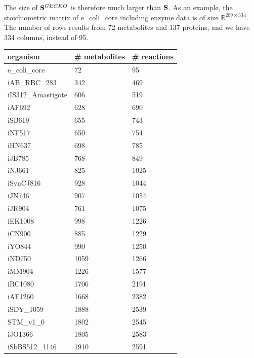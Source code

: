 The size of $\bold S^{GECKO}$ is therefore much larger than $\bold S$.
As an example, the stoichiometric matrix of \textsf{e\_coli\_core} including enzyme data is of size $\mathbb{R}^{209 \times 334}$. The number of rows results from 72 metabolites and 137 proteins, and we have 334 columns, instead of 95. 
\begin{table}[!ht]
    \centering
    \begin{tabular}{lll}
    \hline
        \textbf{organism} & \textbf{\# metabolites} & \textbf{\# reactions} \\ \hline
        e\_coli\_core & 72 & 95 \\ 
        iAB\_RBC\_283 & 342 & 469 \\ 
        iIS312\_Amastigote & 606 & 519 \\ 
        iAF692 & 628 & 690 \\ 
        iSB619 & 655 & 743 \\ 
        iNF517 & 650 & 754 \\ 
        iHN637 & 698 & 785 \\ 
        iJB785 & 768 & 849 \\ 
        iNJ661 & 825 & 1025 \\ 
        iSynCJ816 & 928 & 1044 \\ 
        iJN746 & 907 & 1054 \\ 
        iJR904 & 761 & 1075 \\ 
        iEK1008 & 998 & 1226 \\ 
        iCN900 & 885 & 1229 \\ 
        iYO844 & 990 & 1250 \\ 
        iND750 & 1059 & 1266 \\ 
        iMM904 & 1226 & 1577 \\ 
        iRC1080 & 1706 & 2191 \\ 
        iAF1260 & 1668 & 2382 \\ 
        iSDY\_1059 & 1888 & 2539 \\ 
        STM\_v1\_0 & 1802 & 2545 \\ 
        iJO1366 & 1805 & 2583 \\ 
        iSbBS512\_1146 & 1910 & 2591 \\ 

\end{tabular}
\end{table}
